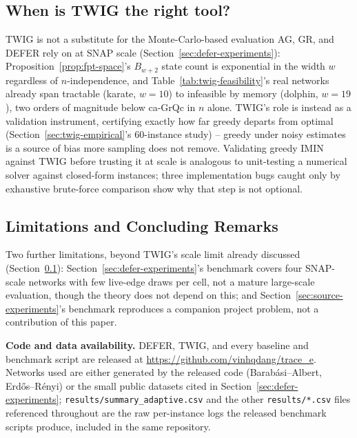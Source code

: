 \documentclass[ASNA,number]{USG}
\begin{document}
\subsection{When is TWIG the right tool?}\label{sec:discussion-twig}

TWIG is not a substitute for the Monte-Carlo-based evaluation AG, GR, and
DEFER rely on at SNAP scale (Section~\ref{sec:defer-experiments}):
Proposition~\ref{prop:fpt-space}'s $B_{w+2}$ state count is exponential in
the width $w$ regardless of $n$-independence, and
Table~\ref{tab:twig-feasibility}'s real networks already span tractable
(karate, $w=10$) to infeasible by memory (dolphin, $w=19$), two orders of
magnitude below ca-GrQc in $n$ alone. TWIG's role is instead as a
validation instrument, certifying exactly how far greedy departs from
optimal (Section~\ref{sec:twig-empirical}'s 60-instance study) -- greedy
under noisy estimates is a source of bias more sampling does not remove.
Validating greedy IMIN against TWIG before trusting it at scale is
analogous to unit-testing a numerical solver against closed-form
instances; three implementation bugs caught only by exhaustive
brute-force comparison show why that step is not optional.

\subsection{Limitations and Concluding Remarks}\label{sec:conclusion}

Two further limitations, beyond TWIG's scale limit already discussed
(Section~\ref{sec:discussion-twig}): Section~\ref{sec:defer-experiments}'s
benchmark covers four SNAP-scale networks with few live-edge draws per
cell, not a mature large-scale evaluation, though the theory does not
depend on this; and Section~\ref{sec:source-experiments}'s benchmark
reproduces a companion project problem, not a contribution of this paper.

\textbf{Code and data availability.} DEFER, TWIG, and every baseline and
benchmark script are released at
\url{https://github.com/vinhqdang/trace_e}. Networks used are either
generated by the released code (Barab\'asi--Albert, Erd\H{o}s--R\'enyi) or
the small public datasets cited in
Section~\ref{sec:defer-experiments}; \texttt{results/summary\_adaptive.csv}
and the other \texttt{results/*.csv} files referenced throughout are the
raw per-instance logs the released benchmark scripts produce,
included in the same repository.

\end{document}
